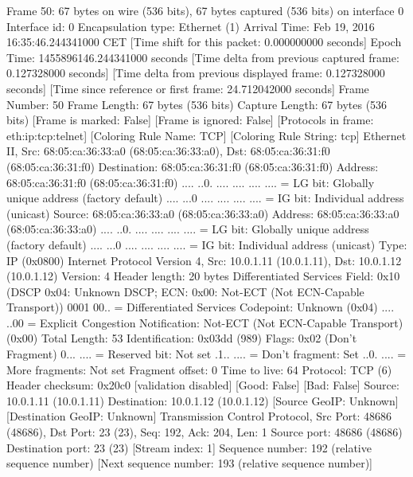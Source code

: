 Frame 50: 67 bytes on wire (536 bits), 67 bytes captured (536 bits) on interface 0
    Interface id: 0
    Encapsulation type: Ethernet (1)
    Arrival Time: Feb 19, 2016 16:35:46.244341000 CET
    [Time shift for this packet: 0.000000000 seconds]
    Epoch Time: 1455896146.244341000 seconds
    [Time delta from previous captured frame: 0.127328000 seconds]
    [Time delta from previous displayed frame: 0.127328000 seconds]
    [Time since reference or first frame: 24.712042000 seconds]
    Frame Number: 50
    Frame Length: 67 bytes (536 bits)
    Capture Length: 67 bytes (536 bits)
    [Frame is marked: False]
    [Frame is ignored: False]
    [Protocols in frame: eth:ip:tcp:telnet]
    [Coloring Rule Name: TCP]
    [Coloring Rule String: tcp]
Ethernet II, Src: 68:05:ca:36:33:a0 (68:05:ca:36:33:a0), Dst: 68:05:ca:36:31:f0 (68:05:ca:36:31:f0)
    Destination: 68:05:ca:36:31:f0 (68:05:ca:36:31:f0)
        Address: 68:05:ca:36:31:f0 (68:05:ca:36:31:f0)
        .... ..0. .... .... .... .... = LG bit: Globally unique address (factory default)
        .... ...0 .... .... .... .... = IG bit: Individual address (unicast)
    Source: 68:05:ca:36:33:a0 (68:05:ca:36:33:a0)
        Address: 68:05:ca:36:33:a0 (68:05:ca:36:33:a0)
        .... ..0. .... .... .... .... = LG bit: Globally unique address (factory default)
        .... ...0 .... .... .... .... = IG bit: Individual address (unicast)
    Type: IP (0x0800)
Internet Protocol Version 4, Src: 10.0.1.11 (10.0.1.11), Dst: 10.0.1.12 (10.0.1.12)
    Version: 4
    Header length: 20 bytes
    Differentiated Services Field: 0x10 (DSCP 0x04: Unknown DSCP; ECN: 0x00: Not-ECT (Not ECN-Capable Transport))
        0001 00.. = Differentiated Services Codepoint: Unknown (0x04)
        .... ..00 = Explicit Congestion Notification: Not-ECT (Not ECN-Capable Transport) (0x00)
    Total Length: 53
    Identification: 0x03dd (989)
    Flags: 0x02 (Don't Fragment)
        0... .... = Reserved bit: Not set
        .1.. .... = Don't fragment: Set
        ..0. .... = More fragments: Not set
    Fragment offset: 0
    Time to live: 64
    Protocol: TCP (6)
    Header checksum: 0x20c0 [validation disabled]
        [Good: False]
        [Bad: False]
    Source: 10.0.1.11 (10.0.1.11)
    Destination: 10.0.1.12 (10.0.1.12)
    [Source GeoIP: Unknown]
    [Destination GeoIP: Unknown]
Transmission Control Protocol, Src Port: 48686 (48686), Dst Port: 23 (23), Seq: 192, Ack: 204, Len: 1
    Source port: 48686 (48686)
    Destination port: 23 (23)
    [Stream index: 1]
    Sequence number: 192    (relative sequence number)
    [Next sequence number: 193    (relative sequence number)]
